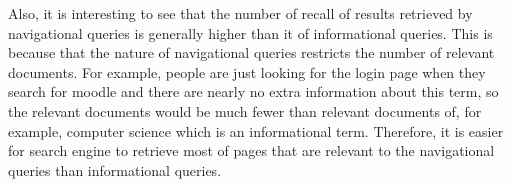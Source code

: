 Also, it is interesting to see that the number of recall of results retrieved by navigational queries is generally higher than it of informational queries. This is because that the nature of navigational queries restricts the number of relevant documents. For example, people are just looking for the login page  when they search for moodle and there are nearly no extra information about this term, so the relevant documents would be much fewer than relevant documents of, for example, computer science which is an informational term. Therefore, it is easier for search engine to retrieve most of pages that are relevant to the navigational queries than informational queries.

\begin{table}[H]
\centering
\caption{informational query}

\label{table2}

\end{table}

\begin{table}[H]
\centering
\caption{navigational query}

\label{table2}
\end{table}

